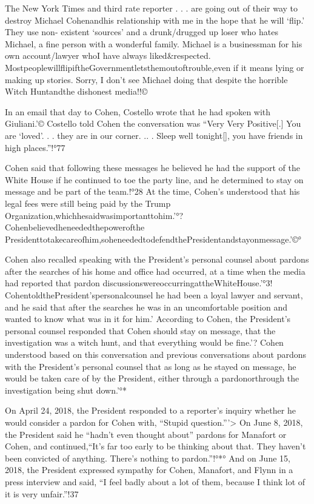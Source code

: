 The New York Times and third rate reporter . . . are going out of their way to destroy Michael Cohenandhis relationship with me in the hope that he will ‘flip.' They use non- existent ‘sources' and a drunk/drugged up loser who hates Michael, a fine person with a wonderful family. Michael is a businessman for his own account/lawyer whoI have always liked&respected. MostpeoplewillflipiftheGovernmentletsthemoutoftrouble,even if it means lying or making up stories. Sorry, I don't see Michael doing that despite the horrible Witch Huntandthe dishonest media!!©%

In an email that day to Cohen, Costello wrote that he had spoken with Giuliani.'© Costello told Cohen the conversation was “Very Very Positive[.] You are ‘loved'. . . they are in our corner. .. . Sleep well tonight[], you have friends in high places.”!°77

Cohen said that following these messages he believed he had the support of the White House if he continued to toe the party line, and he determined to stay on message and be part of the team.!°28 At the time, Cohen's understood that his legal fees were still being paid by the Trump Organization,whichhesaidwasimportanttohim.'°? Cohenbelievedheneededthepowerofthe Presidenttotakecareofhim,soheneededtodefendthePresidentandstayonmessage.'©°

Cohen also recalled speaking with the President's personal counsel about pardons after the searches of his home and office had occurred, at a time when the media had reported that pardon discussionswereoccurringattheWhiteHouse.'°3! CohentoldthePresident'spersonalcounsel he had been a loyal lawyer and servant, and he said that after the searches he was in an uncomfortable position and wanted to know what was in it for him.'%
According to Cohen, the President's personal counsel responded that Cohen should stay on message, that the investigation was a witch hunt, and that everything would be fine.'? Cohen understood based on this conversation and previous conversations about pardons with the President's personal counsel that as long as he stayed on message, he would be taken care of by the President, either through a pardonorthrough the investigation being shut down.'°*

On April 24, 2018, the President responded to a reporter's inquiry whether he would consider a pardon for Cohen with, “Stupid question.”'> On June 8, 2018, the President said he “hadn't even thought about” pardons for Manafort or Cohen, and continued,“It's far too early to be thinking about that. They haven't been convicted of anything. There's nothing to pardon.”!°*° And on June 15, 2018, the President expressed sympathy for Cohen, Manafort, and Flynn in a press interview and said, “I feel badly about a lot of them, because I think lot of it is very unfair.”!37

